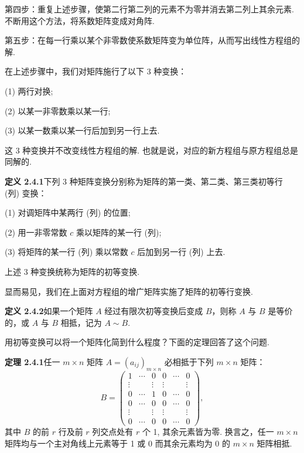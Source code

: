 \documentclass[UTF8,12pt,a4paper,fontset=fandol]{ctexart}
\begin{document}
第四步：重复上述步骤，使第二行第二列的元素不为零并消去第二列上其余元素. 不断用这个方法，将系数矩阵变成对角阵.

第五步：在每一行乘以某个非零数使系数矩阵变为单位阵，从而写出线性方程组的解.

在上述步骤中，我们对矩阵施行了以下 3 种变换：

(1) 两行对换;

(2) 以某一非零数乘以某一行;

(3) 以某一数乘以某一行后加到另一行上去.

这 3 种变换并不改变线性方程组的解. 也就是说，对应的新方程组与原方程组总是同解的.

\noindent\textbf{定义 2.4.1}\quad 下列 3 种矩阵变换分别称为矩阵的第一类、第二类、第三类初等行 (列) 变换：

(1) 对调矩阵中某两行 (列) 的位置;

(2) 用一非零常数 $c$ 乘以矩阵的某一行 (列);

(3) 将矩阵的某一行 (列) 乘以常数 $c$ 后加到另一行 (列) 上去.

上述 3 种变换统称为矩阵的初等变换.

显而易见，我们在上面对方程组的增广矩阵实施了矩阵的初等行变换.

\noindent\textbf{定义 2.4.2}\quad 如果一个矩阵 $A$ 经过有限次初等变换后变成 $B$，则称 $A$ 与 $B$ 是等价的，或 $A$ 与 $B$ 相抵，记为 $A\sim B$.

用初等变换可以将一个矩阵化简到什么程度？下面的定理回答了这个问题.

\noindent\textbf{定理 2.4.1}\quad 任一 $m\times n$ 矩阵 $A=(a_{ij})_{m\times n}$ 必相抵于下列 $m\times n$ 矩阵：
\begin{equation}
B=\left(\begin{array}{cccccc}
1 & \cdots & 0 & 0 & \cdots & 0\\
\vdots & & \vdots & \vdots & & \vdots\\
0 & \cdots & 1 & 0 & \cdots & 0\\
0 & \cdots & 0 & 0 & \cdots & 0\\
\vdots & & \vdots & \vdots & & \vdots\\
0 & \cdots & 0 & 0 & \cdots & 0
\end{array}\right),
\tag{2.4.1}
\end{equation}
其中 $B$ 的前 $r$ 行及前 $r$ 列交点处有 $r$ 个 1, 其余元素皆为零. 换言之，任一 $m\times n$ 矩阵均与一个主对角线上元素等于 1 或 0 而其余元素均为 0 的 $m\times n$ 矩阵相抵.
\end{document}
